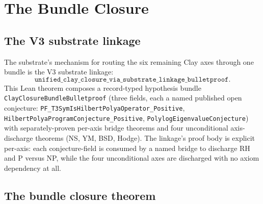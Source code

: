 \documentclass[11pt,a4paper]{amsart}
\theoremstyle{plain}
\theoremstyle{definition}
\begin{document}
\section{The Bundle Closure}\label{sec:bundle-closure}

\subsection{The V3 substrate linkage}

The substrate's mechanism for routing the six remaining Clay axes through one bundle is the V3 substrate linkage:
\[
\texttt{unified\_clay\_closure\_via\_substrate\_linkage\_bulletproof}.
\]
This Lean theorem composes a record-typed hypothesis bundle \texttt{ClayClosureBundleBulletproof} (three fields, each a named published open conjecture: \texttt{PF\_T3SymIsHilbertPolyaOperator\_Positive}, \texttt{HilbertPolyaProgramConjecture\_Positive}, \texttt{PolylogEigenvalueConjecture}) with separately-proven per-axis bridge theorems and four unconditional axis-discharge theorems (NS, YM, BSD, Hodge). The linkage's proof body is explicit per-axis: each conjecture-field is consumed by a named bridge to discharge RH and P versus NP, while the four unconditional axes are discharged with no axiom dependency at all.

\subsection{The bundle closure theorem}
\end{document}

